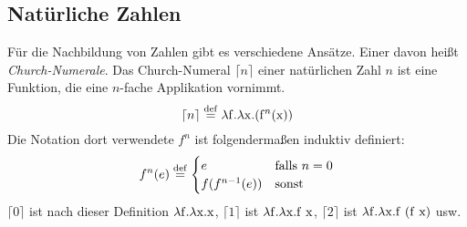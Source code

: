 \subsection{Natürliche Zahlen}

Für die Nachbildung von Zahlen gibt es verschiedene Ansätze.  Einer davon heißt
\textit{Church-Numerale}.  Das
Church-Numeral $\lceil n\rceil$ einer natürlichen Zahl
$n$ ist eine Funktion, die eine $n$-fache Applikation vornimmt.
%
\begin{displaymath}
  \lceil n\rceil \stackrel{\rm def}{=}{} \lambda \mathrm f.\lambda \mathrm x.(\mathrm{f}^n(\mathrm x))
\end{displaymath}
Die Notation dort verwendete $f^n$ ist folgendermaßen induktiv definiert:
%
\begin{displaymath}
  f^n(e) \stackrel{\rm def}{=}
  \begin{cases}
    e & \text{falls } n = 0\\
    f(f^{n-1}(e)) & \text{sonst}
  \end{cases}
\end{displaymath}
%
$\lceil 0\rceil$ ist nach dieser Definition
$\lambda \mathrm f.\lambda \mathrm x.\mathrm x$, $\lceil 1\rceil$ ist $\lambda
\mathrm f.\lambda \mathrm x.\mathrm f~\mathrm x$,
$\lceil 2\rceil$ ist $\lambda \mathrm f.\lambda \mathrm x.\mathrm f~(\mathrm
f~\mathrm x)$ usw.

